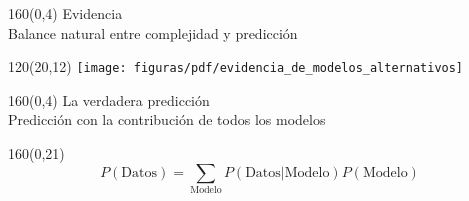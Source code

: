 \documentclass[shownotes,aspectratio=169]{beamer}
\begin{document}
\begin{frame}[plain]
\begin{textblock}{160}(0,4)
\centering \LARGE  Evidencia \\
\large Balance natural entre complejidad y predicci\'on
\end{textblock}


 \begin{textblock}{120}(20,12)
  \centering
  \texttt{[image: figuras/pdf/evidencia\_de\_modelos\_alternativos]}
 \end{textblock}

  \end{frame}



\begin{frame}[plain]
\begin{textblock}{160}(0,4)
\centering \LARGE  La verdadera predicción \\
\large Predicción con la contribución de todos los modelos
\end{textblock}


\begin{textblock}{160}(0,21)
\begin{equation*}
P(\text{Datos}) =  \sum_{\text{Modelo}} P(\text{Datos}|\text{Modelo}) P(\text{Modelo})
\end{equation*}
\end{textblock}

%



\end{frame}
\end{document}
